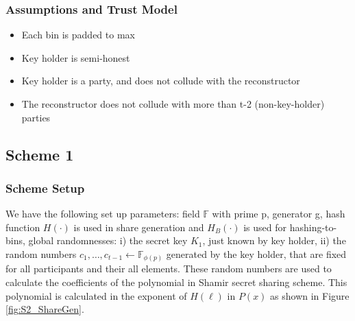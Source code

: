 \subsubsection{Assumptions and Trust Model}
\begin{itemize}
    \item Each bin is padded to max
    \item Key holder is semi-honest
    \item Key holder is a party, and does not collude with the reconstructor
    \item The reconstructor does not collude with more than t-2 (non-key-holder)
    parties
\end{itemize}

\subsection{Scheme 1}
\subsubsection{Scheme Setup}
We have the following set up parameters: field $\mathbb{F}$ with prime p, generator g, hash function $H(\cdot)$ is used in share generation and $H_B(\cdot)$ is used for hashing-to-bins, global randomnesses: i) the secret key $K_1$, just known by key holder, ii) the random numbers $c_1, \ldots, c_{t-1} \gets \mathbb{F}_{\phi(p)}$ generated by the key holder, that are fixed for all participants and their all elements. These random numbers are used to calculate the coefficients of the polynomial in Shamir secret sharing scheme. This polynomial is calculated in the exponent of $H(\ell)$ in $P(x)$ as shown in Figure \ref{fig:S2_ShareGen}.

